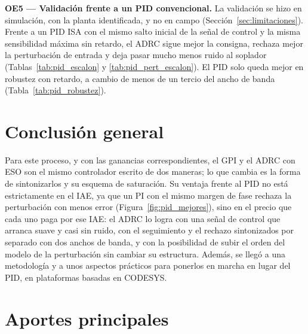 \textbf{OE5 --- Validación frente a un PID convencional.} La validación se hizo en simulación, con la
planta identificada, y no en campo (Sección~\ref{sec:limitaciones}). Frente a un PID ISA con el mismo
salto inicial de la señal de control y la misma sensibilidad máxima sin retardo, el ADRC sigue mejor la
consigna, rechaza mejor la perturbación de entrada y deja pasar mucho menos ruido al soplador
(Tablas~\ref{tab:pid_escalon} y \ref{tab:pid_pert_escalon}). El PID solo queda mejor en robustez con retardo, a cambio de menos
de un tercio del ancho de banda (Tabla~\ref{tab:pid_robustez}).

\section{Conclusión general}

Para este proceso, y con las ganancias correspondientes, el GPI y el ADRC con ESO son el mismo
controlador escrito de dos maneras; lo que cambia es la forma de sintonizarlos y su esquema de
saturación. Su ventaja frente al PID no está estrictamente en el IAE, ya que un PI con el mismo margen
de fase rechaza la perturbación con menos error (Figura~\ref{fig:pid_mejores}), sino en el precio que
cada uno paga por ese IAE: el ADRC lo logra con una señal de control que arranca suave y casi sin ruido,
con el seguimiento y el rechazo sintonizados por separado con dos anchos de banda, y con la posibilidad
de subir el orden del modelo de la perturbación sin cambiar su estructura. Además, se llegó a una
metodología y a unos aspectos prácticos para ponerlos en marcha en lugar del PID, en plataformas basadas
en CODESYS.

\section{Aportes principales}


